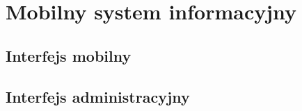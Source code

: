 \chapter{Mobilny system informacyjny}


\section{Interfejs mobilny}


\section{Interfejs administracyjny}

